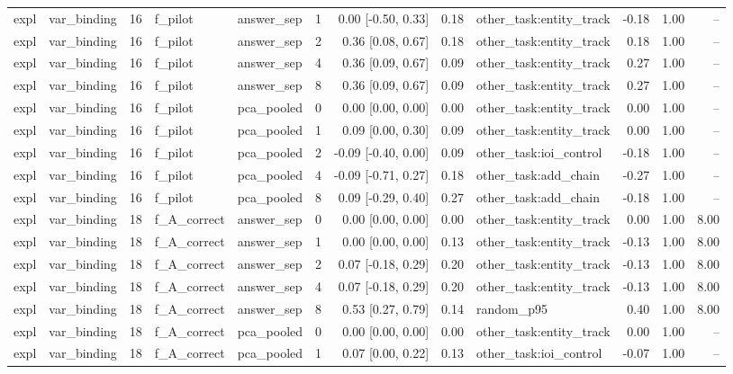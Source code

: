 \begin{tabular}{llrllrrrlrrr}
expl & var\_binding & 16 & f\_pilot & answer\_sep & 1 & 0.00 [-0.50, 0.33] & 0.18 & other\_task:entity\_track & -0.18 & 1.00 & -- \\
expl & var\_binding & 16 & f\_pilot & answer\_sep & 2 & 0.36 [0.08, 0.67] & 0.18 & other\_task:entity\_track & 0.18 & 1.00 & -- \\
expl & var\_binding & 16 & f\_pilot & answer\_sep & 4 & 0.36 [0.09, 0.67] & 0.09 & other\_task:entity\_track & 0.27 & 1.00 & -- \\
expl & var\_binding & 16 & f\_pilot & answer\_sep & 8 & 0.36 [0.09, 0.67] & 0.09 & other\_task:entity\_track & 0.27 & 1.00 & -- \\
expl & var\_binding & 16 & f\_pilot & pca\_pooled & 0 & 0.00 [0.00, 0.00] & 0.00 & other\_task:entity\_track & 0.00 & 1.00 & -- \\
expl & var\_binding & 16 & f\_pilot & pca\_pooled & 1 & 0.09 [0.00, 0.30] & 0.09 & other\_task:entity\_track & 0.00 & 1.00 & -- \\
expl & var\_binding & 16 & f\_pilot & pca\_pooled & 2 & -0.09 [-0.40, 0.00] & 0.09 & other\_task:ioi\_control & -0.18 & 1.00 & -- \\
expl & var\_binding & 16 & f\_pilot & pca\_pooled & 4 & -0.09 [-0.71, 0.27] & 0.18 & other\_task:add\_chain & -0.27 & 1.00 & -- \\
expl & var\_binding & 16 & f\_pilot & pca\_pooled & 8 & 0.09 [-0.29, 0.40] & 0.27 & other\_task:add\_chain & -0.18 & 1.00 & -- \\
expl & var\_binding & 18 & f\_A\_correct & answer\_sep & 0 & 0.00 [0.00, 0.00] & 0.00 & other\_task:entity\_track & 0.00 & 1.00 & 8.00 \\
expl & var\_binding & 18 & f\_A\_correct & answer\_sep & 1 & 0.00 [0.00, 0.00] & 0.13 & other\_task:entity\_track & -0.13 & 1.00 & 8.00 \\
expl & var\_binding & 18 & f\_A\_correct & answer\_sep & 2 & 0.07 [-0.18, 0.29] & 0.20 & other\_task:entity\_track & -0.13 & 1.00 & 8.00 \\
expl & var\_binding & 18 & f\_A\_correct & answer\_sep & 4 & 0.07 [-0.18, 0.29] & 0.20 & other\_task:entity\_track & -0.13 & 1.00 & 8.00 \\
expl & var\_binding & 18 & f\_A\_correct & answer\_sep & 8 & 0.53 [0.27, 0.79] & 0.14 & random\_p95 & 0.40 & 1.00 & 8.00 \\
expl & var\_binding & 18 & f\_A\_correct & pca\_pooled & 0 & 0.00 [0.00, 0.00] & 0.00 & other\_task:entity\_track & 0.00 & 1.00 & -- \\
expl & var\_binding & 18 & f\_A\_correct & pca\_pooled & 1 & 0.07 [0.00, 0.22] & 0.13 & other\_task:ioi\_control & -0.07 & 1.00 & -- \\

\end{tabular}

